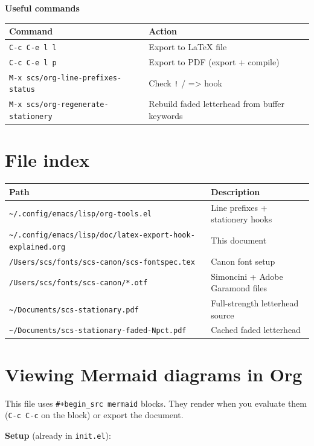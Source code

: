 \documentclass[11pt]{article}
\begin{document}
\textbf{\textbf{Useful commands}}

\begin{center}
\begin{tabular}{ll}
Command & Action\\
\hline
\texttt{C-c C-e l l} & Export to \LaTeX{} file\\
\texttt{C-c C-e l p} & Export to PDF (export + compile)\\
\texttt{M-x scs/org-line-prefixes-status} & Check \texttt{!} / => hook\\
\texttt{M-x scs/org-regenerate-stationery} & Rebuild faded letterhead from buffer keywords\\
\end{tabular}
\end{center}
\section*{File index}
\label{sec:orgfede262}

\begin{center}
\begin{tabular}{ll}
Path & Description\\
\hline
\texttt{\textasciitilde{}/.config/emacs/lisp/org-tools.el} & Line prefixes + stationery hooks\\
\texttt{\textasciitilde{}/.config/emacs/lisp/doc/latex-export-hook-explained.org} & This document\\
\texttt{/Users/scs/fonts/scs-canon/scs-fontspec.tex} & Canon font setup\\
\texttt{/Users/scs/fonts/scs-canon/*.otf} & Simoncini + Adobe Garamond files\\
\texttt{\textasciitilde{}/Documents/scs-stationary.pdf} & Full-strength letterhead source\\
\texttt{\textasciitilde{}/Documents/scs-stationary-faded-Npct.pdf} & Cached faded letterhead\\
\end{tabular}
\end{center}
\section*{Viewing Mermaid diagrams in Org}
\label{sec:org1e1836d}

This file uses \texttt{\#+begin\_src mermaid} blocks.  They render when you evaluate
them (\texttt{C-c C-c} on the block) or export the document.

\textbf{\textbf{Setup}} (already in \texttt{init.el}):
\end{document}
